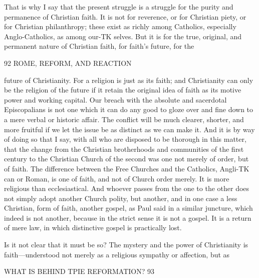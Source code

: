 \documentclass[12pt,a5paper,twoside]{book}
\begin{document}
That is why I say that the present struggle is a 
struggle for the purity and permanence of Christian 
faith. It is not for reverence, or for Christian piety, or 
for Christian philanthropy; these exist as richly among 
Catholics, especially Anglo-Catholics, as among our-TK
selves. But it is for the true, original, and permanent 
nature of Christian faith, for faith's future, for the 



92 ROME, REFORM, AND REACTION 

future of Christianity. For a religion is just as its 
faith; and Christianity can only be the religion of the 
future if it retain the original idea of faith as its motive 
power and working capital. Our breach with the 
absolute and sacerdotal Episcopalians is not one which 
it can do any good to gloze over and fine down to a 
mere verbal or historic affair. The conflict will be 
much clearer, shorter, and more fruitful if we let the 
issue be as distinct as we can make it. And it is by 
way of doing so that I say, with all who are disposed 
to be thorough in this matter, that the change from 
the Christian brotherhoods and communities of the first 
century to the Christian Church of the second was 
one not merely of order, but of faith. The difference 
between the Free Churches and the Catholics, Angli-TK
can or Roman, is one of faith, and not of Church 
order merely. It is more religious than ecclesiastical. 
And whoever passes from the one to the other does 
not simply adopt another Church polity, but another, 
and in one case a less Christian, form of faith, another 
gospel, as Paul said in a similar juncture, which 
indeed is not another, because in the strict sense it is 
not a gospel. It is a return of mere law, in which 
distinctive gospel is practically lost. 

Is it not clear that it must be so? The mystery 
and the power of Christianity is faith---understood not 
merely as a religious sympathy or affection, but as 



WHAT IS BEHIND TPIE REFORMATION? 93 
\end{document}
